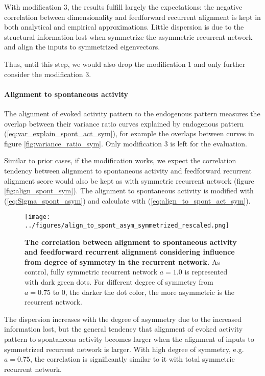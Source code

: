 \documentclass[11pt]{article}
\begin{document}
	With modification 3, the results fulfill largely the expectations: the negative correlation between dimensionality and feedforward recurrent alignment is kept in both analytical and empirical approximations. Little dispersion is due to the structural information lost when symmetrize the asymmetric recurrent network and align the inputs to symmetrized eigenvectors. 
	
	Thus, until this step, we would also drop the modification 1 and only further consider the modification 3. 
	
	\paragraph{Alignment to spontaneous activity}
	The alignment of evoked activity pattern to the endogenous pattern measures the overlap between their variance ratio curves explained by endogenous pattern (\ref{eq:var_explain_spont_act_sym}), for example the overlaps between curves in figure \ref{fig:variance_ratio_sym}. Only modification 3 is left for the evaluation. 
	
	Similar to prior cases, if the modification works, we expect the correlation tendency between alignment to spontaneous activity and feedforward recurrent alignment score would also be kept as with symmetric recurrent network (figure \ref{fig:align_spont_sym}). The alignment to spontaneous activity is modified with (\ref{eq:Sigma_spont_asym}) and calculate with (\ref{eq:align_to_spont_act_sym}). 
		\vspace{-0.5cm}
		\begin{SCfigure}[0.9][h] 
			\centering
			\caption{\textbf{The correlation between alignment to spontaneous activity and feedforward recurrent alignment considering influence from degree of symmetry in the recurrent network.} As control, fully symmetric recurrent network $a=1.0$ is represented with dark green dots. For different degree of symmetry from $a = 0.75$ to $0$, the darker the dot color, the more asymmetric is the recurrent network. }
			\texttt{[image: ../figures/align\_to\_spont\_asym\_symmetrized\_rescaled.png]}
			\label{fig:align_to_spont_asym}
		\end{SCfigure}
	
	The dispersion increases with the degree of asymmetry due to the increased information lost, but the general tendency that alignment of evoked activity pattern to spontaneous activity becomes larger when the alignment of inputs to symmetrized recurrent network is larger. With high degree of symmetry, e.g. $a = 0.75$, the correlation is significantly similar to it with total symmetric recurrent network.
	
\end{document}
